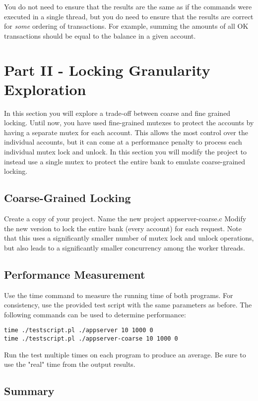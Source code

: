 \documentclass[letterpaper,10pt]{article}
\begin{document}
You do not need to ensure that the results are the same as if the commands were executed in a
single thread, but you do need to ensure that the results are correct for \emph{some}
ordering of transactions. For example, summing the amounts of all OK transactions should
be equal to the balance in a given account.

\section{Part II - Locking Granularity Exploration}

In this section you will explore a trade-off between coarse and fine grained locking. Until now, you have
used fine-grained mutexes to protect the accounts by having a separate mutex for each account. This
allows the most control over the individual accounts, but it can come at a performance penalty to process
each individual mutex lock and unlock. In this section you will modify the project to instead use a single
mutex to protect the entire bank to emulate coarse-grained locking.

\subsection{Coarse-Grained Locking}

Create a copy of your project. Name the new project appserver-coarse.c Modify the new version to lock
the entire bank (every account) for each request. Note that this uses a significantly smaller number of
mutex lock and unlock operations, but also leads to a significantly smaller concurrency among the worker
threads.

\subsection{Performance Measurement}

Use the time command to measure the running time of both programs. For consistency, use the provided
test script with the same parameters as before. The following commands can be used to determine
performance:
\begin{verbatim}
time ./testscript.pl ./appserver 10 1000 0
time ./testscript.pl ./appserver-coarse 10 1000 0
\end{verbatim}

Run the test multiple times on each program to produce an average. Be sure to use the "real" time
from the output results.

\subsection{Summary}
\end{document}
